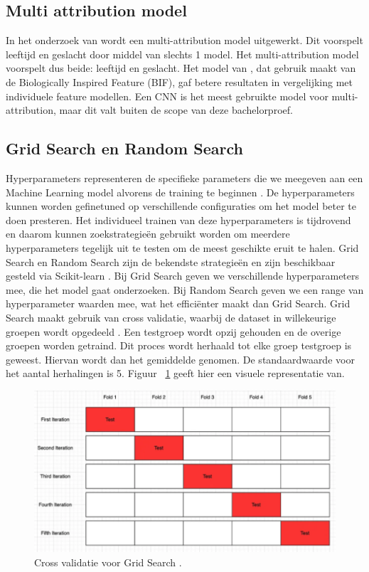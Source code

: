 \subsection{Multi attribution model}\label{sub:mamodel}
In het onderzoek van \autocite{Gupta2022} wordt een multi-attribution model uitgewerkt. Dit voorspelt leeftijd en geslacht door middel van slechts 1 model. Het multi-attribution model voorspelt dus beide: leeftijd en geslacht. Het model van \autocite{Guo2014}, dat gebruik maakt van de Biologically Inspired Feature (BIF), gaf betere resultaten in vergelijking met individuele feature modellen. Een CNN is het meest gebruikte model voor multi-attribution, maar dit valt buiten de scope van deze bachelorproef.

\subsection{Grid Search en Random Search} \label{sub:gridsearch}
Hyperparameters representeren de specifieke parameters die we meegeven aan een Machine Learning model alvorens de training te beginnen \autocite{Ibtisamah2023}. De hyperparameters kunnen worden gefinetuned op verschillende configuraties om het model beter te doen presteren. Het individueel trainen van deze hyperparameters is tijdrovend en daarom kunnen zoekstrategieën gebruikt worden om meerdere hyperparameters tegelijk uit te testen om de meest geschikte eruit te halen. Grid Search en Random Search zijn de bekendste strategieën en zijn beschikbaar gesteld via Scikit-learn \autocite{ScikitLearn2024}. Bij Grid Search geven we verschillende hyperparameters mee, die het model gaat onderzoeken. Bij Random Search geven we een range van hyperparameter waarden mee, wat het efficiënter maakt dan Grid Search.  Grid Search maakt gebruik van cross validatie, waarbij de dataset in willekeurige groepen wordt opgedeeld \autocite{Beheshti2022}. Een testgroep wordt opzij gehouden en de overige groepen worden getraind. Dit proces wordt herhaald tot elke groep testgroep is geweest. Hiervan wordt dan het gemiddelde genomen. De standaardwaarde voor het aantal herhalingen is 5. Figuur ~\ref{fig:crossval} geeft hier een visuele representatie van. 

\begin{figure}[H]
    \centering
    \includegraphics{graphics/gridsearch.png}
    \caption[Cross validatie voor Grid Search]{Cross validatie voor Grid Search \autocite{Beheshti2022}.
        \label{fig:crossval}}
\end{figure}\\

